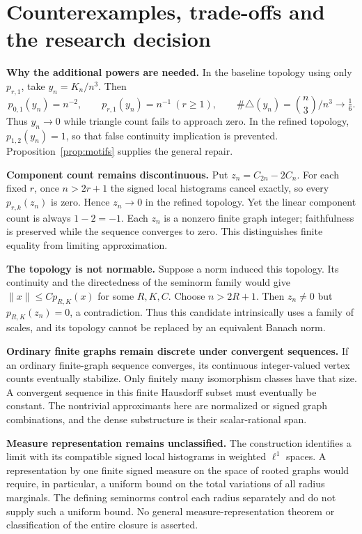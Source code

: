 \documentclass[11pt]{article}
\theoremstyle{definition}\newtheorem{definition}[theorem]{Definition}
\begin{document}
\section{Counterexamples, trade-offs and the research decision}\label{sec:limits}

\textbf{Why the additional powers are needed.} In the baseline topology using only $p_{r,1}$, take $y_n=K_n/n^3$. Then
\[
 p_{0,1}(y_n)=n^{-2},\qquad
 p_{r,1}(y_n)=n^{-1}\ (r\ge1),\qquad
 \#\triangle(y_n)=\binom n3/n^3\longrightarrow\tfrac16.
\]
Thus $y_n\to0$ while triangle count fails to approach zero. In the refined topology, $p_{1,2}(y_n)=1$, so that false continuity implication is prevented. Proposition~\ref{prop:motifs} supplies the general repair.

\textbf{Component count remains discontinuous.} Put $z_n=C_{2n}-2C_n$. For each fixed $r$, once $n>2r+1$ the signed local histograms cancel exactly, so every $p_{r,k}(z_n)$ is zero. Hence $z_n\to0$ in the refined topology. Yet the linear component count is always $1-2=-1$. Each $z_n$ is a nonzero finite graph integer; faithfulness is preserved while the sequence converges to zero. This distinguishes finite equality from limiting approximation.

\textbf{The topology is not normable.} Suppose a norm induced this topology. Its continuity and the directedness of the seminorm family would give $\|x\|\le C p_{R,K}(x)$ for some $R,K,C$. Choose $n>2R+1$. Then $z_n\ne0$ but $p_{R,K}(z_n)=0$, a contradiction. Thus this candidate intrinsically uses a family of scales, and its topology cannot be replaced by an equivalent Banach norm.

\textbf{Ordinary finite graphs remain discrete under convergent sequences.} If an ordinary finite-graph sequence converges, its continuous integer-valued vertex counts eventually stabilize. Only finitely many isomorphism classes have that size. A convergent sequence in this finite Hausdorff subset must eventually be constant. The nontrivial approximants here are normalized or signed graph combinations, and the dense substructure is their scalar-rational span.

\textbf{Measure representation remains unclassified.} The construction identifies a limit with its compatible signed local histograms in weighted $\ell^1$ spaces. A representation by one finite signed measure on the space of rooted graphs would require, in particular, a uniform bound on the total variations of all radius marginals. The defining seminorms control each radius separately and do not supply such a uniform bound. No general measure-representation theorem or classification of the entire closure is asserted.
\end{document}
